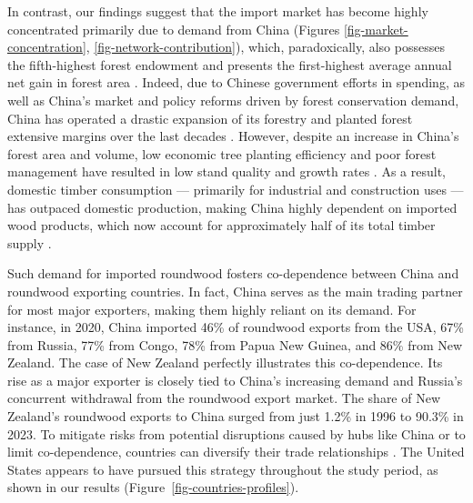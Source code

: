 \documentclass[
  authoryear,
  review,
  3p]{elsarticle}
\begin{document}
In contrast, our findings suggest that the import market has become
highly concentrated primarily due to demand from China (Figures
\ref{fig-market-concentration}, \ref{fig-network-contribution}), which,
paradoxically, also possesses the fifth-highest forest endowment and
presents the first-highest average annual net gain in forest area
\citep{fao_state_2024}. Indeed, due to Chinese government efforts in
spending, as well as China's market and policy reforms driven by forest
conservation demand, China has operated a drastic expansion of its
forestry and planted forest extensive margins over the last decades
\citep{demurger_forest_2009, ke_changes_2019, zhang_chinas_2019, zhao_large-scale_2022}.
However, despite an increase in China's forest area and volume, low
economic tree planting efficiency and poor forest management have
resulted in low stand quality and growth rates
\citep{hoffmann_adapting_2018, hou_intensifying_2019, ke_changes_2019, zhang_chinas_2019}.
As a result, domestic timber consumption --- primarily for industrial
and construction uses --- has outpaced domestic production, making China
highly dependent on imported wood products, which now account for
approximately half of its total timber supply
\citep{demurger_forest_2009, he_projection_2011, hoffmann_adapting_2018, hou_intensifying_2019, ke_changes_2019}.

Such demand for imported roundwood fosters co-dependence between China
and roundwood exporting countries. In fact, China serves as the main
trading partner for most major exporters, making them highly reliant on
its demand. For instance, in 2020, China imported 46\% of roundwood
exports from the USA, 67\% from Russia, 77\% from Congo, 78\% from Papua
New Guinea, and 86\% from New Zealand. The case of New Zealand perfectly
illustrates this co-dependence. Its rise as a major exporter is closely
tied to China's increasing demand and Russia's concurrent withdrawal
from the roundwood export market. The share of New Zealand's roundwood
exports to China surged from just 1.2\% in 1996 to 90.3\% in 2023. To
mitigate risks from potential disruptions caused by hubs like China or
to limit co-dependence, countries can diversify their trade
relationships \citep{huang_static_2024}. The United States appears to
have pursued this strategy throughout the study period, as shown in our
results (Figure~\ref{fig-countries-profiles}).
\end{document}
